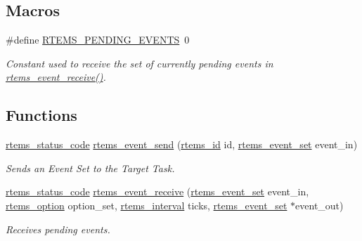 \subsection*{Macros}
\begin{DoxyCompactItemize}
\item 
\mbox{\label{group__ClassicEvent_ga803a2cd3251ce738676d7f988082a1cf}} 
\#define \mbox{\hyperlink{group__ClassicEvent_ga803a2cd3251ce738676d7f988082a1cf}{R\+T\+E\+M\+S\+\_\+\+P\+E\+N\+D\+I\+N\+G\+\_\+\+E\+V\+E\+N\+TS}}~0
\begin{DoxyCompactList}\small\item\em Constant used to receive the set of currently pending events in \mbox{\hyperlink{group__ClassicEvent_ga87a7b47e1856045e4361f5619ad697cb}{rtems\+\_\+event\+\_\+receive()}}. \end{DoxyCompactList}\end{DoxyCompactItemize}
\subsection*{Functions}
\begin{DoxyCompactItemize}
\item 
\mbox{\hyperlink{group__ClassicStatus_ga545d41846817eaba6143d52ee4d9e9fe}{rtems\+\_\+status\+\_\+code}} \mbox{\hyperlink{group__ClassicEvent_ga2d31674c165127bc530178d06d557b94}{rtems\+\_\+event\+\_\+send}} (\mbox{\hyperlink{group__ClassicTasks_gab20892b814dced7dd4e5b9bf42becd57}{rtems\+\_\+id}} id, \mbox{\hyperlink{group__ClassicEventSet_gab7b8f373bea85fd4e3b7ae23905faa07}{rtems\+\_\+event\+\_\+set}} event\+\_\+in)
\begin{DoxyCompactList}\small\item\em Sends an Event Set to the Target Task. \end{DoxyCompactList}\item 
\mbox{\hyperlink{group__ClassicStatus_ga545d41846817eaba6143d52ee4d9e9fe}{rtems\+\_\+status\+\_\+code}} \mbox{\hyperlink{group__ClassicEvent_ga87a7b47e1856045e4361f5619ad697cb}{rtems\+\_\+event\+\_\+receive}} (\mbox{\hyperlink{group__ClassicEventSet_gab7b8f373bea85fd4e3b7ae23905faa07}{rtems\+\_\+event\+\_\+set}} event\+\_\+in, \mbox{\hyperlink{group__ClassicOptions_gad26685eb0e60a9650082935c31920e29}{rtems\+\_\+option}} option\+\_\+set, \mbox{\hyperlink{group__ClassicTasks_gad39c43f949683d46874e3a5586b93aee}{rtems\+\_\+interval}} ticks, \mbox{\hyperlink{group__ClassicEventSet_gab7b8f373bea85fd4e3b7ae23905faa07}{rtems\+\_\+event\+\_\+set}} $\ast$event\+\_\+out)
\begin{DoxyCompactList}\small\item\em Receives pending events. \end{DoxyCompactList}\end{DoxyCompactItemize}


